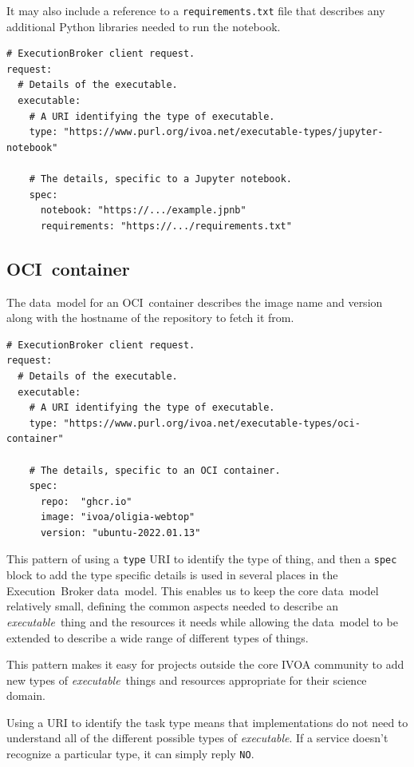 \documentclass[11pt,a4paper]{ivoa}
\newcommand{\datamodel} {data~model}
\newcommand{\ivoa} {IVOA}
\newcommand{\executionbroker} {Execution~Broker}
\newcommand{\python} {Python}
\newcommand{\ocicontainer} {OCI~container}
\newcommand{\codeword}[1] {\texttt{#1}}
\newcommand{\executable} {\textit{executable}}
\newcommand{\executablething} {\textit{executable}~thing}
\begin{document}
It may also include a reference to a \codeword{requirements.txt} file that describes any additional \python{}
libraries needed to run the notebook.
\begin{lstlisting}[]
# ExecutionBroker client request.
request:
  # Details of the executable.
  executable:
    # A URI identifying the type of executable.
    type: "https://www.purl.org/ivoa.net/executable-types/jupyter-notebook"

    # The details, specific to a Jupyter notebook.
    spec:
      notebook: "https://.../example.jpnb"
      requirements: "https://.../requirements.txt"
\end{lstlisting}

\subsection{\ocicontainer{}}
\label{ocicontainer}
The \datamodel{} for an \ocicontainer{} describes the image name and version
along with the hostname of the repository to fetch it from.

\begin{lstlisting}[]
# ExecutionBroker client request.
request:
  # Details of the executable.
  executable:
    # A URI identifying the type of executable.
    type: "https://www.purl.org/ivoa.net/executable-types/oci-container"

    # The details, specific to an OCI container.
    spec:
      repo:  "ghcr.io"
      image: "ivoa/oligia-webtop"
      version: "ubuntu-2022.01.13"
\end{lstlisting}

This pattern of using a \codeword{type} URI to identify the type of thing, and then a
\codeword{spec} block to add the type specific details is used in several places in the
\executionbroker{} \datamodel{}.
This enables us to keep the core \datamodel{} relatively small, defining the common aspects
needed to describe an \executablething{} and the resources it needs while allowing the
\datamodel{} to be extended to describe a wide range of different types of things.

This pattern makes it easy for projects outside the core \ivoa{} community to add new
types of \executablething{}s and resources appropriate for their science domain.

Using a URI to identify the task type means that implementations do not need to understand
all of the different possible types of \executable{}.
If a service doesn’t recognize a particular type, it can simply reply \codeword{NO}.
\end{document}
